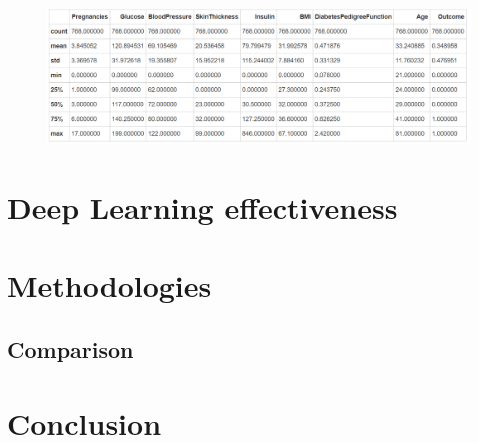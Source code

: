 \documentclass[11pt,en]{elegantpaper}
\begin{document}
\begin{figure}[H]
    \centering
    \includegraphics[scale=0.6]{figure/2.PNG}  
\end{figure}

\section{Deep Learning effectiveness}


\section{Methodologies}


\subsection{Comparison}


\section{Conclusion}


%
\end{document}
